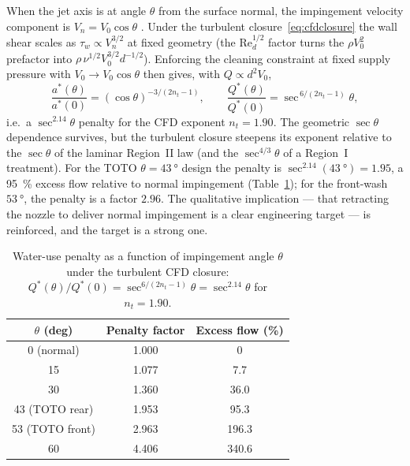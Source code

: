 \documentclass[aps,prfluids,reprint,amsmath,amssymb,floatfix]{revtex4-2}
\newcommand{\Rey}{\mathrm{Re}}
\begin{document}
When the jet axis is at angle $\theta$ from the surface normal, the
impingement velocity component is $V_n = V_0 \cos\theta$
\citep{BeitelmalEtAl2000}. Under the turbulent closure~\eqref{eq:cfdclosure}
the wall shear scales as $\tau_w \propto V_n^{3/2}$ at fixed geometry (the
$\Rey_d^{1/2}$ factor turns the $\rho V_0^2$ prefactor into
$\rho\,\nu^{1/2}V_0^{3/2}d^{-1/2}$). Enforcing the cleaning constraint at fixed
supply pressure with $V_0 \to V_0\cos\theta$ then gives, with $Q \propto d^2 V_0$,
\begin{equation}
  \frac{a^*(\theta)}{a^*(0)} = (\cos\theta)^{-3/(2n_t-1)},
  \qquad
  \frac{Q^*(\theta)}{Q^*(0)} = \sec^{\,6/(2n_t-1)}\theta,
  \label{eq:obliqueII}
\end{equation}
i.e.\ a $\sec^{2.14}\theta$ penalty for the CFD exponent $n_t = 1.90$. The
geometric $\sec\theta$ dependence survives, but the turbulent closure steepens
its exponent relative to the $\sec\theta$ of the laminar Region~II law (and
the $\sec^{4/3}\theta$ of a Region~I treatment). For the TOTO
$\theta = \SI{43}{\degree}$ design the penalty is
$\sec^{2.14}(\SI{43}{\degree}) = 1.95$, a \SI{95}{\percent} excess flow
relative to normal impingement (Table~\ref{tab:oblique}); for the front-wash
$\SI{53}{\degree}$, the penalty is a factor $2.96$. The qualitative
implication --- that retracting the nozzle to deliver normal impingement is a
clear engineering target --- is reinforced, and the target is a strong one.

\begin{table}[h]
\centering
\caption{Water-use penalty as a function of impingement angle $\theta$ under
the turbulent CFD closure:
$Q^*(\theta)/Q^*(0) = \sec^{6/(2n_t-1)}\theta = \sec^{2.14}\theta$
for $n_t = 1.90$.}
\label{tab:oblique}
\begin{tabular}{ccc}
\toprule
$\theta$ (deg) & Penalty factor & Excess flow (\%) \\
\midrule
0 (normal)  & 1.000 & 0 \\
15          & 1.077 & 7.7 \\
30          & 1.360 & 36.0 \\
43 (TOTO rear)  & 1.953 & 95.3 \\
53 (TOTO front) & 2.963 & 196.3 \\
60          & 4.406 & 340.6 \\
\bottomrule
\end{tabular}
\end{table}

\end{document}
